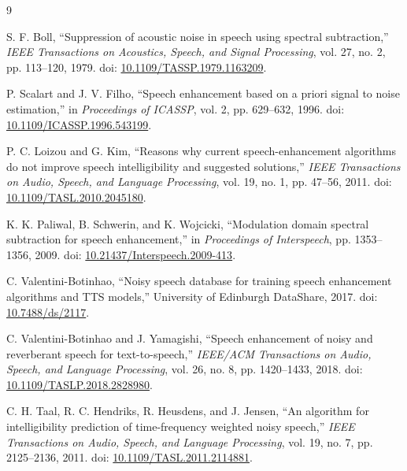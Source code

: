 \documentclass[11pt,a4paper]{article}
\begin{document}
\begin{thebibliography}{9}

S. F. Boll, ``Suppression of acoustic noise in speech using spectral subtraction,''
\emph{IEEE Transactions on Acoustics, Speech, and Signal Processing}, vol. 27,
no. 2, pp. 113--120, 1979. doi: \href{https://doi.org/10.1109/TASSP.1979.1163209}{10.1109/TASSP.1979.1163209}.

P. Scalart and J. V. Filho, ``Speech enhancement based on a priori signal to noise estimation,''
in \emph{Proceedings of ICASSP}, vol. 2, pp. 629--632, 1996.
doi: \href{https://doi.org/10.1109/ICASSP.1996.543199}{10.1109/ICASSP.1996.543199}.

P. C. Loizou and G. Kim, ``Reasons why current speech-enhancement algorithms do not improve speech intelligibility and suggested solutions,''
\emph{IEEE Transactions on Audio, Speech, and Language Processing}, vol. 19,
no. 1, pp. 47--56, 2011. doi: \href{https://doi.org/10.1109/TASL.2010.2045180}{10.1109/TASL.2010.2045180}.

K. K. Paliwal, B. Schwerin, and K. Wojcicki,
``Modulation domain spectral subtraction for speech enhancement,''
in \emph{Proceedings of Interspeech}, pp. 1353--1356, 2009.
doi: \href{https://doi.org/10.21437/Interspeech.2009-413}{10.21437/Interspeech.2009-413}.

C. Valentini-Botinhao, ``Noisy speech database for training speech enhancement algorithms and TTS models,''
University of Edinburgh DataShare, 2017.
doi: \href{https://doi.org/10.7488/ds/2117}{10.7488/ds/2117}.

C. Valentini-Botinhao and J. Yamagishi, ``Speech enhancement of noisy and reverberant speech for text-to-speech,''
\emph{IEEE/ACM Transactions on Audio, Speech, and Language Processing}, vol. 26,
no. 8, pp. 1420--1433, 2018.
doi: \href{https://doi.org/10.1109/TASLP.2018.2828980}{10.1109/TASLP.2018.2828980}.

C. H. Taal, R. C. Hendriks, R. Heusdens, and J. Jensen,
``An algorithm for intelligibility prediction of time-frequency weighted noisy speech,''
\emph{IEEE Transactions on Audio, Speech, and Language Processing}, vol. 19,
no. 7, pp. 2125--2136, 2011.
doi: \href{https://doi.org/10.1109/TASL.2011.2114881}{10.1109/TASL.2011.2114881}.

\end{thebibliography}
\end{document}
